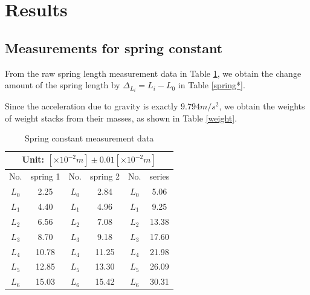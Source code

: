 \section{Results}
\subsection{Measurements for spring constant}
    From the raw spring length measurement data in Table \ref{spring}, we obtain the change amount of the spring length by $\Delta_{L_i}=L_i-L_0$ in Table \ref{spring*}.

    Since the acceleration due to gravity is exactly $9.794m/s^2$, we obtain the weights of weight stacks from their masses, as shown in Table \ref{weight}.
    \begin{table}[htbp]
        \centering
        \begin{tabular}{|c|c|c|c|c|c|}
            \hline
            \multicolumn{6}{|c|}{Unit: $[\times 10^{-2}m]\pm 0.01[\times 10^{-2}m]$}\\ \hline
            No. & spring 1 & No. & spring 2 & No. & series\\ \hline
            $L_0$ & 2.25 & $L_0$ & 2.84 & $L_0$ & 5.06\\ \hline
            $L_1$ & 4.40 & $L_1$ & 4.96	& $L_1$ & 9.25\\ \hline
            $L_2$ & 6.56 & $L_2$ & 7.08 & $L_2$ & 13.38\\ \hline
            $L_3$ & 8.70 & $L_3$ & 9.18	& $L_3$ & 17.60\\ \hline
            $L_4$ & 10.78 & $L_4$ & 11.25 & $L_4$ & 21.98\\ \hline
            $L_5$ & 12.85 & $L_5$ & 13.30 & $L_5$ & 26.09\\ \hline
            $L_6$ & 15.03 & $L_6$ &	15.42 & $L_6$ &	30.31\\ \hline
        \end{tabular}
        \caption{Spring constant measurement data}\label{spring}
    \end{table}
